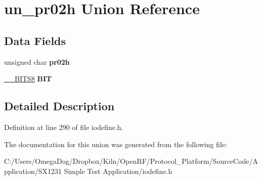 \hypertarget{unionun__pr02h}{\section{un\-\_\-pr02h Union Reference}
\label{unionun__pr02h}
}
\subsection*{Data Fields}
\begin{DoxyCompactItemize}
\item 
\hypertarget{unionun__pr02h_a4bfd053a471c51c5f0e340c2155d4f76}{unsigned char {\bfseries pr02h}}\label{unionun__pr02h_a4bfd053a471c51c5f0e340c2155d4f76}

\item 
\hypertarget{unionun__pr02h_a2bef959048122d16b9c1d7e9e2ce5bd5}{\hyperlink{struct_____b_i_t_s8}{\-\_\-\-\_\-\-B\-I\-T\-S8} {\bfseries B\-I\-T}}\label{unionun__pr02h_a2bef959048122d16b9c1d7e9e2ce5bd5}

\end{DoxyCompactItemize}


\subsection{Detailed Description}


Definition at line 290 of file iodefine.\-h.



The documentation for this union was generated from the following file\-:\begin{DoxyCompactItemize}
\item 
C\-:/\-Users/\-Omega\-Dog/\-Dropbox/\-Kiln/\-Open\-R\-F/\-Protocol\-\_\-\-Platform/\-Source\-Code/\-Application/\-S\-X1231 Simple Test Application/iodefine.\-h\end{DoxyCompactItemize}
